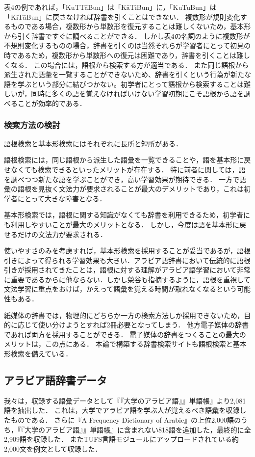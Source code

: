 \documentclass[technicalreport]{ieicej}
\begin{document}
表4の例であれば，「KuTT\=aBun」は「K\=aTiBun」に，「KuTuBun」は「KiT\=aBun」に戻さなければ辞書を引くことはできない．
複数形が規則変化するものである場合，複数形から単数形を復元することは難しくないため，基本形から引く辞書ですぐに調べることができる．
しかし表4の名詞のように複数形が不規則変化するものの場合，辞書を引くのは当然それらが学習者にとって初見の時であるため，複数形から単数形への復元は困難であり，辞書を引くことは難しくなる．
この場合には，語根から検索する方が適当である．
また同じ語根から派生された語彙を一覧することができないため、辞書を引くという行為が新たな語を学ぶという部分に結びつかない。初学者にとって語根から検索することは難しいが，同時に多くの語を覚えなければいけない学習初期にこそ語根から語を調べることが効率的である．

\subsubsection{検索方法の検討}
語根検索と基本形検索にはそれぞれに長所と短所がある．

語根検索には，同じ語根から派生した語彙を一覧できることや，語を基本形に戻せなくても検索できるといったメリットが存在する．
特に前者に関しては，語を調べつつ新たな語を学ぶことができ，高い学習効果が期待できる．
一方で語彙の語根を見抜く文法力が要求されることが最大のデメリットであり，これは初学者にとって大きな障害となる．

基本形検索では，語根に関する知識がなくても辞書を利用できるため，初学者にも利用しやすいことが最大のメリットとなる．
しかし，今度は語を基本形に戻せるだけの文法力が要求される．

使いやすさのみを考慮すれば，基本形検索を採用することが妥当であるが，語根引きによって得られる学習効果も大きい．アラビア語辞書において伝統的に語根引きが採用されてきたことは，語根に対する理解がアラビア語学習において非常に重要であるからに他ならない．しかし榮谷\cite{sakaedani2008}も指摘するように，語根を重視して文法学習に重点をおけば，かえって語彙を覚える時間が取れなくなるという可能性もある．

紙媒体の辞書では，物理的にどちらか一方の検索方法しか採用できないため，目的に応じて使い分けようとすれば2冊必要となってしまう．
他方電子媒体の辞書であれば両方を採用することができる．
電子媒体の辞書をつくることの最大のメリットは，この点にある．
本論で構築する辞書検索サイトも語根検索と基本形検索を備えている．

\subsection{アラビア語辞書データ}
我々は，収録する語彙データとして『『大学のアラビア語』』単語帳』より2,081語を抽出した．
これは，大学でアラビア語を学ぶ人が覚えるべき語彙を収録したものである．
さらに『A Frequency Dictionary of Arabic』の上位2,000語のうち，『『大学のアラビア語』』単語帳』に含まれない818語を追加した，最終的に全2,909語を収録した．
またTUFS言語モジュール\cite{kawaguchi2007}にアップロードされている約2,000文を例文として収録した．
\end{document}
